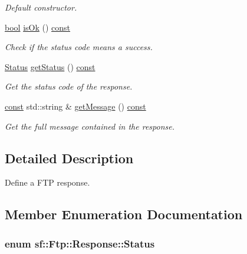 \begin{DoxyCompactItemize}
\begin{DoxyCompactList}\small\item\em Default constructor. \end{DoxyCompactList}\item 
\hyperlink{term__entry_8h_a002004ba5d663f149f6c38064926abac}{bool} \hyperlink{classsf_1_1_ftp_1_1_response_a4dadbe0fe0a3ef2d571a017e1645e675}{is\-Ok} () \hyperlink{term__entry_8h_a57bd63ce7f9a353488880e3de6692d5a}{const} 
\begin{DoxyCompactList}\small\item\em Check if the status code means a success. \end{DoxyCompactList}\item 
\hyperlink{classsf_1_1_ftp_1_1_response_af81738f06b6f571761696291276acb3b}{Status} \hyperlink{classsf_1_1_ftp_1_1_response_ac7f937b3883d1c4fbc75c003a1786aaa}{get\-Status} () \hyperlink{term__entry_8h_a57bd63ce7f9a353488880e3de6692d5a}{const} 
\begin{DoxyCompactList}\small\item\em Get the status code of the response. \end{DoxyCompactList}\item 
\hyperlink{term__entry_8h_a57bd63ce7f9a353488880e3de6692d5a}{const} std\-::string \& \hyperlink{classsf_1_1_ftp_1_1_response_a0015675c528a4a84a671484b9e5499d6}{get\-Message} () \hyperlink{term__entry_8h_a57bd63ce7f9a353488880e3de6692d5a}{const} 
\begin{DoxyCompactList}\small\item\em Get the full message contained in the response. \end{DoxyCompactList}\end{DoxyCompactItemize}


\subsection{Detailed Description}
Define a F\-T\-P response. 

\subsection{Member Enumeration Documentation}
\hypertarget{classsf_1_1_ftp_1_1_response_af81738f06b6f571761696291276acb3b}{
\subsubsection[{Status}]{\setlength{\rightskip}{0pt plus 5cm}enum {\bf sf\-::\-Ftp\-::\-Response\-::\-Status}}}\label{classsf_1_1_ftp_1_1_response_af81738f06b6f571761696291276acb3b}


